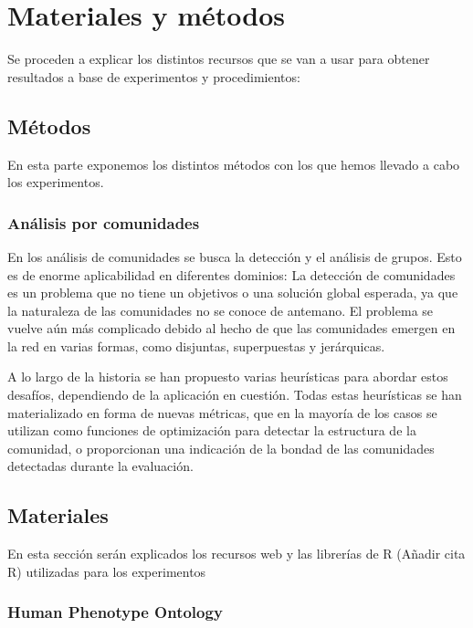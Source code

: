 \section{Materiales y métodos}

Se proceden a explicar los distintos recursos que se van a usar para obtener resultados a base de experimentos y procedimientos:

\subsection{Métodos}

En esta parte exponemos los distintos métodos con los que hemos llevado a cabo los experimentos.

\subsubsection{Análisis por comunidades}

En los análisis de comunidades \cite{Comun_Analisis} se busca la detección y el análisis de grupos. Esto es de enorme aplicabilidad en diferentes dominios: La detección de comunidades es un problema que no tiene un objetivos o una solución global esperada, ya que la naturaleza de las comunidades no se conoce de antemano. El problema se vuelve aún más complicado debido al hecho de que las comunidades emergen en la red en varias formas, como disjuntas, superpuestas y jerárquicas\cite{ComAnalisisStruct}.

\hfill

A lo largo de la historia se han propuesto varias heurísticas\cite{Comun_Analisis_2} para abordar estos desafíos, dependiendo de la aplicación en cuestión. Todas estas heurísticas se han materializado en forma de nuevas métricas, que en la mayoría de los casos se utilizan como funciones de optimización para detectar la estructura de la comunidad, o proporcionan una indicación de la bondad de las comunidades detectadas durante la evaluación.


\subsection{Materiales}

En esta sección serán explicados los recursos web y las librerías de R (Añadir cita R) utilizadas para los experimentos

\subsubsection{Human Phenotype Ontology}

